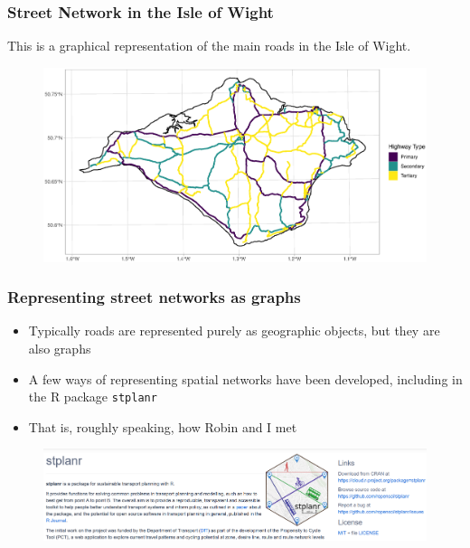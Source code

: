 \documentclass[c,10pt,pdftex]{beamer}
\begin{document}
\begin{frame}
\frametitle{Street Network in the Isle of Wight}
This is a graphical representation of the main roads in the Isle of Wight. 
\vspace{-0.75cm}
\begin{figure}
\centering
\includegraphics[width = 1.05\linewidth]{images/highway_type}
\end{figure}
\end{frame}

\begin{frame}
  \frametitle{Representing street networks as graphs}
  \vspace{-0.75cm}
  \begin{itemize}
    \setlength\itemsep{1em}
    \item Typically roads are represented purely as geographic objects, but they are also graphs
    \item A few ways of representing spatial networks have been developed, including in the R package \texttt{stplanr}
    \item That is, roughly speaking, how Robin and I met
  \end{itemize}
  \begin{figure}
  	\centering
  	\includegraphics[width = 1.05\linewidth]{images/stplanr-wide-screenshot}
  \end{figure}	
\end{frame}

% 
\end{document}
